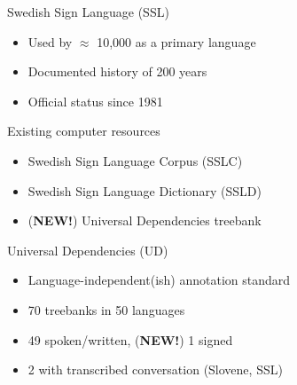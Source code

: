 \documentclass[final]{beamer}
\begin{document}
\begin{frame}{}
    \vfill
    \begin{columns}[t]
        \begin{column}{.48\linewidth}

            \begin{block}{\large Swedish Sign Language (SSL)}
                \begin{itemize}
                    \item Used by $\approx$ 10,000 as a primary language
                    \item Documented history of 200 years
                    \item Official status since 1981
                \end{itemize}
            \end{block}

            \begin{block}{\large Existing computer resources}
                \begin{itemize}
                    \item Swedish Sign Language Corpus (SSLC)
                    \item Swedish Sign Language Dictionary (SSLD)
                    \item (\textbf{NEW!}) Universal Dependencies treebank
                \end{itemize}
            \end{block}

            \begin{block}{\large Universal Dependencies (UD)}
                \begin{itemize}
                    \item Language-independent(ish) annotation standard
                    \item 70 treebanks in 50 languages
                    \item 49 spoken/written, (\textbf{NEW!}) 1 signed
                    \item 2 with transcribed conversation (Slovene, SSL)
                \end{itemize}
            \end{block}


\end{column}
\end{columns}
\end{frame}
\end{document}
